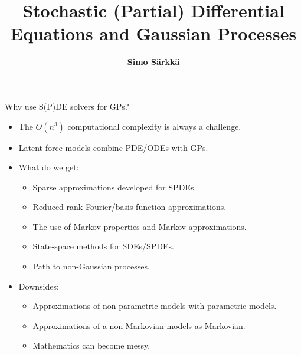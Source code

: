 \documentclass[first=dgreen,second=purple,presentation]{elecslides}
\title{Stochastic (Partial) Differential Equations and Gaussian Processes}
\author{{\bf Simo S\"arkk\"a}}
\institute{Aalto University, Finland}
\date{}
\begin{document}

\aaltotitleframe




\begin{frame}{Why use S(P)DE solvers for GPs?}

\begin{itemize}[<+->]
\item The $O(n^3)$ \alert{computational complexity} is always a challenge.
\item \alert{Latent force models} combine PDE/ODEs with GPs.
\item What do we get:
\begin{itemize}[<+->]
\item \alert{Sparse approximations} developed for SPDEs.
\item \alert{Reduced rank} Fourier/basis function approximations.
\item The use of \alert{Markov properties} and Markov approximations.
\item \alert{State-space} methods for SDEs/SPDEs.
\item Path to \alert{non-Gaussian processes}.
\end{itemize}
\item Downsides:
\begin{itemize}[<+->]
\item Approximations of non-parametric models with parametric models.
\item Approximations of a non-Markovian models as Markovian.
\item Mathematics can become messy.
\end{itemize}
\end{itemize}
\end{frame}
\end{document}

